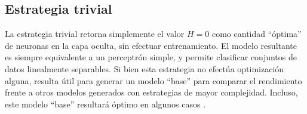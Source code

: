 %
\subsection{Estrategia trivial}
%
La estrategia trivial retorna simplemente el valor $H=0$ como cantidad
``óptima'' de neuronas en la capa oculta, sin efectuar entrenamiento.
El modelo resultante es siempre equivalente a un perceptrón simple, y
permite clasificar conjuntos de datos linealmente separables.
Si bien esta estrategia no efectúa optimización alguna, resulta útil
para generar un modelo ``base'' para comparar el rendimiento frente a
otros modelos generados con estrategias de mayor complejidad.
Incluso, este modelo ``base'' resultará óptimo en algunos casos
\cite{nnfaq3}.

